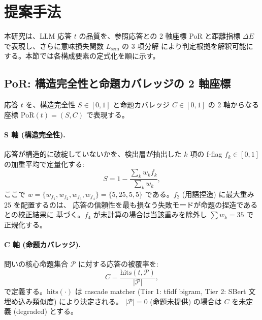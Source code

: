 %

\section{提案手法}
\label{sec:method}

本研究は、LLM 応答 $t$ の品質を、参照応答との 2 軸座標 PoR と距離指標
$\Delta E$ で表現し、さらに意味損失関数 $L_{\mathrm{sem}}$ の 3 項分解
により判定根拠を解釈可能にする。本節では各構成要素の定式化を順に示す。

\subsection{PoR: 構造完全性と命題カバレッジの 2 軸座標}
\label{sec:method:por}

応答 $t$ を、構造完全性 $S \in [0, 1]$ と命題カバレッジ
$C \in [0, 1]$ の 2 軸からなる座標
$\mathrm{PoR}(t) = (S, C)$ で表現する。

\paragraph{S 軸 (構造完全性).}
応答が構造的に破綻していないかを、検出層が抽出した
$k$ 項の f-flag $f_k \in [0, 1]$ の加重平均で定量化する:
\begin{equation}
\label{eq:s}
S = 1 - \frac{\sum_{k} w_k f_k}{\sum_{k} w_k},
\end{equation}
ここで $w = \{w_{f_1}, w_{f_2}, w_{f_3}, w_{f_4}\}
= \{5, 25, 5, 5\}$ である。$f_2$ (用語捏造) に最大重み 25 を配置するのは、
応答の信頼性を最も損なう失敗モードが命題の捏造であるとの校正結果に
基づく。$f_4$ が未計算の場合は当該重みを除外し $\sum w_k = 35$ で
正規化する。

\paragraph{C 軸 (命題カバレッジ).}
問いの核心命題集合 $\mathcal{P}$ に対する応答の被覆率を:
\begin{equation}
\label{eq:c}
C = \frac{\mathrm{hits}(t, \mathcal{P})}{|\mathcal{P}|},
\end{equation}
で定義する。$\mathrm{hits}(\cdot)$ は cascade matcher
(Tier 1: tfidf bigram, Tier 2: SBert 文埋め込み類似度) により決定される。
$|\mathcal{P}| = 0$ (命題未提供) の場合は $C$ を未定義 (degraded) とする。

